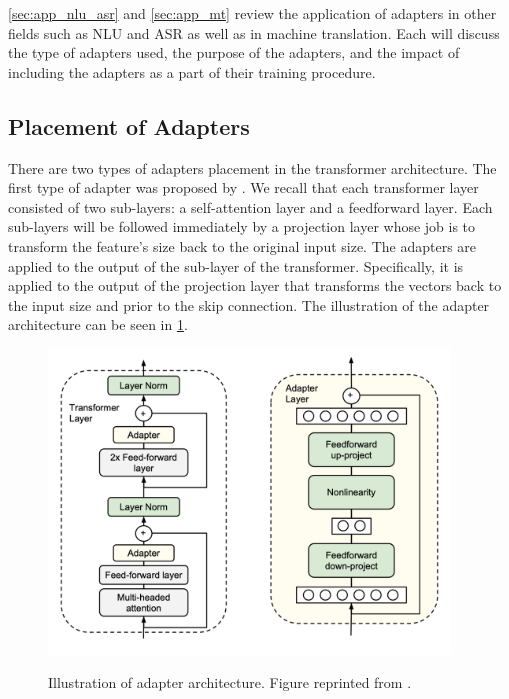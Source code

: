 \cref{sec:app_nlu_asr} and \cref{sec:app_mt} review the application of adapters in other fields such as NLU and ASR as well as in machine translation. Each will discuss the type of adapters used, the purpose of the adapters, and the impact of including the adapters as a part of their training procedure.

\subsection{Placement of Adapters}
\label{sec:adapter_place}
There are two types of adapters placement in the transformer architecture. The first type of adapter was proposed by . We recall that each transformer layer consisted of two sub-layers: a self-attention layer and a feedforward layer. Each sub-layers will be followed immediately by a projection layer whose job is to transform the feature's size back to the original input size. The adapters are applied to the output of the sub-layer of the transformer. Specifically, it is applied to the output of the projection layer that transforms the vectors back to the input size and prior to the skip connection. The illustration of the adapter architecture can be seen in \cref{img:ada_houlsby}.

\begin{figure}[h]
    {\includegraphics[width=0.95\textwidth]{img/adapter_houlsby.png}}
    \centering
    \caption{Illustration of adapter architecture. Figure reprinted from .}
    \label{img:ada_houlsby}
\end{figure}

